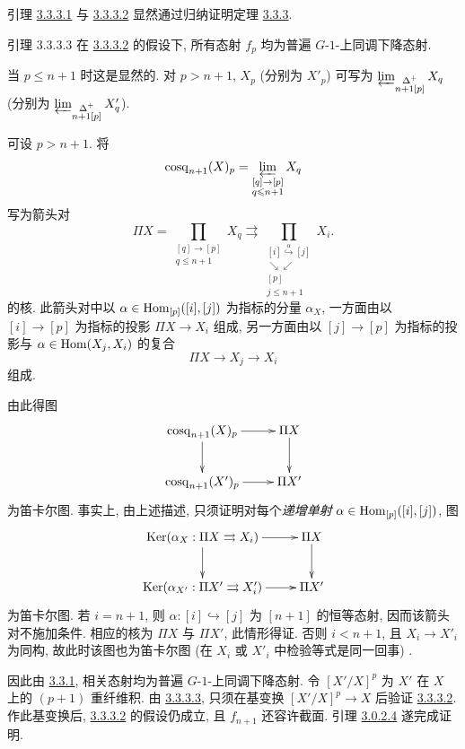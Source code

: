 引理 \hyperref[Vbis.lem3.3.3.1]{3.3.3.1} 与
\hyperref[Vbis.lem3.3.3.2]{3.3.3.2} 显然通过归纳证明定理 \hyperref[Vbis.thm3.3.3]{3.3.3}.

\begin{enonce*}{引理 3.3.3.3}
在 \hyperref[Vbis.lem3.3.3.2]{3.3.3.2} 的假设下,
所有态射 $f_p$ 均为普遍 $G$-$1$-上同调下降态射.
\end{enonce*}

当 $p\leq n+1$ 时这是显然的.
对 $p>n+1$, $X_p$ (分别为 $X'_p$) 可写为
$\varprojlim_{\substack{\Delta^+\\ n+1[p]}}X_q$
(分别为 $\varprojlim_{\substack{\Delta^+\\ n+1[p]}}X'_q$).

可设 $p>n+1$. 将
$$
\operatorname{cosq}_{n+1}(X)_p=
\varprojlim_{\substack{[q]\rightarrow[p]\\q\leqslant n+1}}X_q
$$
写为箭头对
$$
\Pi X=\prod_{\substack{[q]\rightarrow[p]\\q\leq n+1}}X_q
\rightrightarrows
\prod_{\substack{[i]\stackrel{\alpha}{\hookrightarrow}[j]\\
\searrow\swarrow\\{}[p]\\j\leq n+1}}X_i.
$$
的核.
此箭头对中以 $\alpha\in\operatorname{Hom}_{[p]}([i],[j])$ 为指标的分量 $\alpha_X$,
一方面由以 $[i]\to[p]$ 为指标的投影 $\Pi X\to X_i$ 组成,
另一方面由以 $[j]\to[p]$ 为指标的投影与 $\alpha\in\operatorname{Hom}(X_j,X_i)$ 的复合
$$
\Pi X\longrightarrow X_j\longrightarrow X_i
$$
组成.

由此得图
$$
\xymatrix{\cosq_{n+1}(X)_p\ar[r]\ar[d]&\Pi X\ar[d]\\
\cosq_{n+1}(X')_p\ar[r]&\Pi X'}
$$
为笛卡尔图. 事实上, 由上述描述,
只须证明对每个\textit{递增单射} $\alpha\in\operatorname{Hom}_{[p]}([i],[j])$, 图
$$
\xymatrix{\Ker(\alpha_X:\Pi X\rightrightarrows X_i)\ar[r]\ar[d]&
\Pi X\ar[d]\\
\Ker(\alpha_{X'}:\Pi X'\rightrightarrows X'_i)\ar[r]&\Pi X'}
$$
为笛卡尔图. 若 $i=n+1$, 则 $\alpha:[i]\hookrightarrow[j]$
为 $[n+1]$ 的恒等态射, 因而该箭头对不施加条件.
相应的核为 $\Pi X$ 与 $\Pi X'$, 此情形得证.
否则 $i<n+1$, 且 $X_i\to X'_i$ 为同构,
故此时该图也为笛卡尔图 (在 $X_i$ 或 $X'_i$ 中检验等式是同一回事)
.

因此由 \hyperref[Vbis.prop3.3.1]{3.3.1},
相关态射均为普遍 $G$-$1$-上同调下降态射.
令 $[X'/X]^p$ 为 $X'$ 在 $X$ 上的 $(p+1)$ 重纤维积.
由 \hyperref[Vbis.lem3.3.3.3]{3.3.3.3},
只须在基变换 $[X'/X]^p\to X$ 后验证 \hyperref[Vbis.lem3.3.3.2]{3.3.3.2}.
作此基变换后, \hyperref[Vbis.lem3.3.3.2]{3.3.3.2} 的假设仍成立,
且 $f_{n+1}$ 还容许截面. 引理 \hyperref[Vbis.lem3.0.2.4]{3.0.2.4} 遂完成证明.

